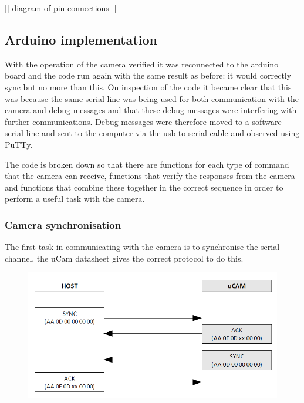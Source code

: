 [] diagram of pin connections []

\subsection{Arduino implementation}

With the operation of the camera verified it was reconnected to the arduino board and the code run again with the same result as before: it would correctly sync but no more than this. On inspection of the code it became clear that this was because the same serial line was being used for both communication with the camera and debug messages and that these debug messages were interfering with further communications. Debug messages were therefore moved to a software serial line and sent to the computer via the usb to serial cable and observed using PuTTy.

The code is broken down so that there are functions for each type of command that the camera can receive, functions that verify the responses from the camera and functions that combine these together in the correct sequence in order to perform a useful task with the camera.

\subsubsection{Camera synchronisation}

The first task in communicating with the camera is to synchronise the serial channel, the uCam datasheet gives the correct protocol to do this.

\begin{figure}[H]
        \centering
        \includegraphics[width=1.00\textwidth]{figures/SyncProtocal.png}
        \label{fig:syncProto}
\end{figure}

